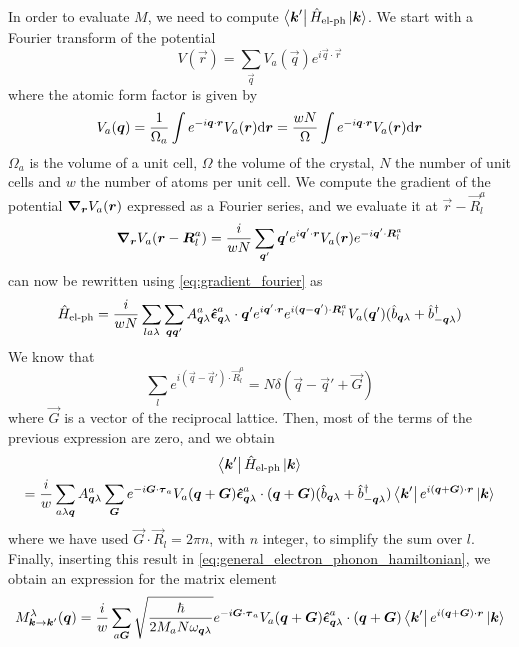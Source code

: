 In order to evaluate $M$, we need to compute $\bra{\mathbf{\boldsymbol{k}}'} \hat{H}_\text{el-ph} \ket{\mathbf{\boldsymbol{k}}}$. We start with a Fourier transform of the potential
\begin{equation}
    V(\vec{r}) = \sum_\vec{q} V_a(\vec{q})e^{i\vec{q}\cdot\vec{r}}
\end{equation}
where the atomic form factor is given by
\begin{equation}
    V_a(\vec{q}) = \frac{1}{\Omega_a} \int e^{-i\vec{q
            }\cdot \vec{r}} V_a(\vec{r}) \differential \vec{r} = \frac{wN}{\Omega} \int e^{-i\vec{q
            }\cdot \vec{r}} V_a(\vec{r}) \differential \vec{r}
\end{equation}
$\Omega_a$ is the volume of a unit cell, $\Omega$ the volume of the crystal, $N$ the number of unit cells and $w$ the number of atoms per unit cell. We compute the gradient of the potential $\grad_{\mathbf{\boldsymbol{r}}} V_a(\mathbf{\boldsymbol{r}})$ expressed as a Fourier series, and we evaluate it at $\vec{r}-\vec{R}_l^a$
\begin{equation}\label{eq:gradient_fourier}
    \grad_{\mathbf{\boldsymbol{r}}} V_a(\mathbf{\boldsymbol{r}} - \mathbf{\boldsymbol{R}}_l^a) = \frac{i}{wN} \sum_{\mathbf{\boldsymbol{q}}'} \mathbf{\boldsymbol{q}}' e^{i\mathbf{\boldsymbol{q}}'\cdot \mathbf{\boldsymbol{r}}} V_a(\mathbf{\boldsymbol{r}}) e^{-i\mathbf{\boldsymbol{q}}'\cdot \mathbf{\boldsymbol{R}}_l^a}
\end{equation}
 can now be rewritten using \cref{eq:gradient_fourier} as
\begin{equation}
    \hat{H}_\text{el-ph} = \frac{i}{wN} \sum_{la\lambda} \sum_{\mathbf{\boldsymbol{q}}\mathbf{\boldsymbol{q}}'} A_{\mathbf{\boldsymbol{q}}\lambda}^a \mathbf{\boldsymbol{\hat{\epsilon}}}_{\mathbf{\boldsymbol{q}}\lambda}^a \cdot \mathbf{\boldsymbol{q}}' e^{i\mathbf{\boldsymbol{q}}'\cdot \mathbf{\boldsymbol{r}}} e^{i(\mathbf{\boldsymbol{q}}-\mathbf{\boldsymbol{q}}') \cdot \mathbf{\boldsymbol{R}}_l^a} V_a(\mathbf{\boldsymbol{q}}'   )  (\hat{b}_{\mathbf{\boldsymbol{q}}\lambda} + \hat{b}^\dagger_{-\mathbf{\boldsymbol{q}}\lambda})
\end{equation}
We know that
\begin{equation}
    \sum_l e^{i(\vec{q}-\vec{q}') \cdot \vec{R}_l^a} = N \delta(\vec{q} - \vec{q}' + \vec{G})
\end{equation}
where $\vec{G}$ is a vector of the reciprocal lattice. Then, most of the terms of the previous expression are zero, and we obtain
\begin{multline}
    \bra{\mathbf{\boldsymbol{k}}'}\hat{H}_\text{el-ph}\ket{\mathbf{\boldsymbol{k}}}
    \\ = \frac{i}{w} \sum_{a\lambda\mathbf{\boldsymbol{q}}} A_{\mathbf{\boldsymbol{q}}\lambda}^a \sum_{\mathbf{\boldsymbol{G}}}  e^{-i \mathbf{\boldsymbol{G}} \cdot \mathbf{\boldsymbol{\tau}}_a} V_a(\mathbf{\boldsymbol{q}} + \mathbf{\boldsymbol{G}}   ) \mathbf{\boldsymbol{\hat{\epsilon}}}_{\mathbf{\boldsymbol{q}}\lambda}^a \cdot (\mathbf{\boldsymbol{q}}+\mathbf{\boldsymbol{G}}) (\hat{b}_{\mathbf{\boldsymbol{q}}\lambda} + \hat{b}^\dagger_{-\mathbf{\boldsymbol{q}}\lambda}) \bra{\mathbf{\boldsymbol{k}}'} e^{i(\mathbf{\boldsymbol{q}} + \mathbf{\boldsymbol{G}})\cdot \mathbf{\boldsymbol{r}}} \ket{\mathbf{\boldsymbol{k}}}
\end{multline}
where we have used $\vec{G} \cdot \vec{R}_l = 2\pi n$, with $n$ integer, to simplify the sum over $l$. Finally, inserting this result in \cref{eq:general_electron_phonon_hamiltonian}, we obtain an expression for the matrix element
\begin{equation}
    M_{\mathbf{\boldsymbol{k}} \rightarrow \mathbf{\boldsymbol{k}}'}^\lambda(\mathbf{\boldsymbol{q}}) =  \frac{i}{w} \sum_{a\mathbf{\boldsymbol{G}}} \sqrt{\frac{\hbar}{2M_aN\omega_{\mathbf{\boldsymbol{q}}\lambda}}}  e^{-i \mathbf{\boldsymbol{G}} \cdot \mathbf{\boldsymbol{\tau}}_a} V_a(\mathbf{\boldsymbol{q}} + \mathbf{\boldsymbol{G}}) \mathbf{\boldsymbol{\hat{\epsilon}}}_{\mathbf{\boldsymbol{q}}\lambda}^a \cdot (\mathbf{\boldsymbol{q}}+\mathbf{\boldsymbol{G}}) \bra{\mathbf{\boldsymbol{k}}'} e^{i(\mathbf{\boldsymbol{q}} + \mathbf{\boldsymbol{G}})\cdot \mathbf{\boldsymbol{r}}} \ket{\mathbf{\boldsymbol{k}}}
\end{equation}

